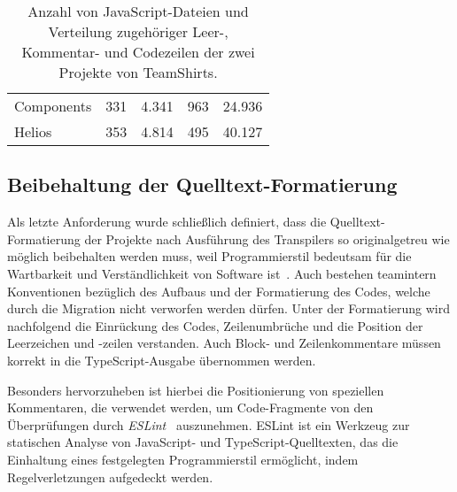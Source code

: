 \bigbreak
\begin{table}[tbh]
  \footnotesize
  \begin{tabu} to 
    \midrule
     &  &  &  &   \\
    \midrule
    Components & 331 & 4.341 & 963 & 24.936 \\
    Helios & 353 & 4.814 & 495 & 40.127 \\
    \midrule
  \end{tabu}
  \caption{Anzahl von JavaScript-Dateien und Verteilung zugehöriger Leer-, Kommentar- und Codezeilen der zwei Projekte von TeamShirts.}
  \label{tab:projects-loc}
\end{table}

\subsection{Beibehaltung der Quelltext-Formatierung}
\label{subsec:requirement:format}

Als letzte Anforderung wurde schließlich definiert, dass die Quelltext-Formatierung der Projekte nach Ausführung des Transpilers so originalgetreu wie möglich beibehalten werden muss, weil Programmierstil bedeutsam für die Wartbarkeit und Verständlichkeit von Software ist~\autocite[146]{KERNIGHAN:1982}. Auch bestehen teamintern Konventionen bezüglich des Aufbaus und der Formatierung des Codes, welche durch die Migration nicht verworfen werden dürfen. Unter der Formatierung wird nachfolgend die Einrückung des Codes, Zeilenumbrüche und die Position der Leerzeichen und -zeilen verstanden. Auch Block- und Zeilenkommentare müssen korrekt in die TypeScript-Ausgabe übernommen werden.

Besonders hervorzuheben ist hierbei die Positionierung von speziellen Kommentaren, die verwendet werden, um Code-Fragmente von den Überprüfungen durch \textit{ESLint}~\autocite{ESLINT} auszunehmen. ESLint ist ein Werkzeug zur statischen Analyse von JavaScript- und TypeScript-Quelltexten, das die Einhaltung eines festgelegten Programmierstil ermöglicht, indem Regelverletzungen aufgedeckt werden.
